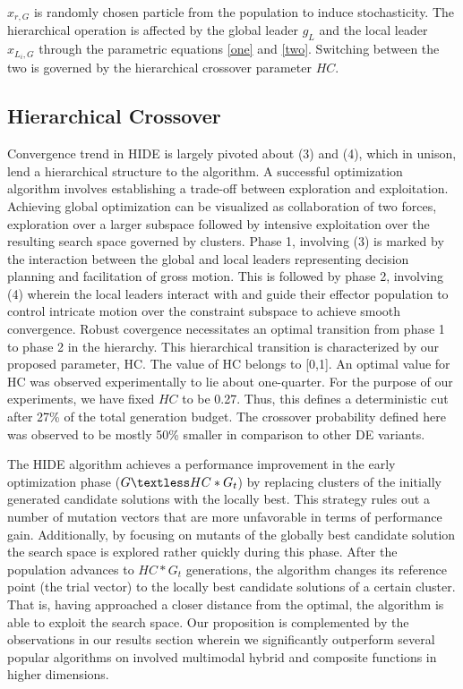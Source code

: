 \documentclass[a4paper,twoside]{article}
\begin{document}
$x_{r,G}$ is randomly chosen particle from the population to induce stochasticity. The hierarchical operation is affected by the global leader $g_L$ and the local leader $x_{L_i,G}$  through the parametric equations \eqref{one} and \eqref{two}. Switching between the two is governed by the hierarchical crossover parameter $HC$.


\subsection{Hierarchical Crossover}

Convergence trend in HIDE is largely pivoted about (3) and (4), which in unison, lend a hierarchical structure to the algorithm. A successful optimization algorithm involves establishing a trade-off between exploration and exploitation. Achieving global optimization can be visualized as collaboration of two forces, exploration over a larger subspace followed by intensive exploitation over the resulting search space governed by clusters. Phase 1, involving (3) is marked by the interaction between the global and local leaders representing decision planning and facilitation of gross motion. This is followed by phase 2, involving (4) wherein the local leaders interact with and guide their effector population to control intricate motion over the constraint subspace to achieve smooth convergence. Robust covergence necessitates an optimal transition from phase 1 to phase 2 in the hierarchy. This hierarchical transition is characterized by our proposed parameter, HC. The value of HC belongs to [0,1]. An optimal value for HC was observed experimentally to lie about one-quarter. For the purpose of our experiments, we have fixed $HC$ to be 0.27. Thus, this defines a deterministic cut after 27\% of the total generation budget. The crossover probability defined here was observed to be mostly 50\% smaller in comparison to other DE variants.

The HIDE algorithm achieves a performance improvement in the early optimization phase ($G \textless HC*G_{t}$) by replacing clusters of the initially generated candidate solutions with the locally best. This strategy rules out a number of mutation vectors that are more unfavorable in terms of performance gain. Additionally, by focusing on mutants of the globally best candidate solution the search space is explored rather quickly during this phase. After the population advances to $HC*G_{t}$ generations, the algorithm changes its reference point (the trial vector) to the locally best candidate solutions of a certain cluster. That is, having approached a closer distance from the optimal, the algorithm is able to exploit the search space. Our proposition is complemented by the observations in our results section wherein we significantly outperform several popular algorithms on involved multimodal hybrid and composite functions in higher dimensions.
\end{document}
